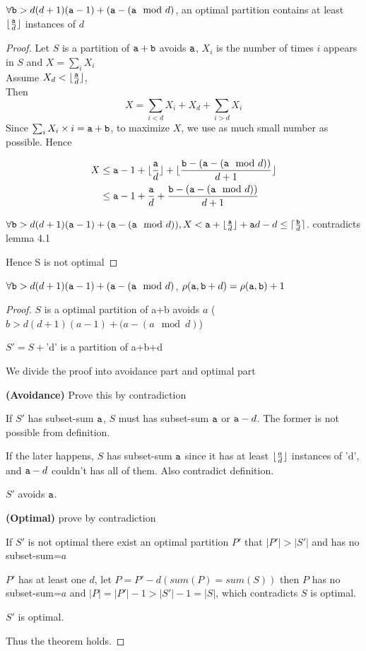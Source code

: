 \begin{theorem} 
$\forall \mathtt{b}>d(d+1)(\mathtt{a}-1)  + (\mathtt{a} - (\mathtt{a}\mod d)$, an optimal partition contains at least $\lfloor{\frac{\mathtt{a}}{d}}\rfloor$ instances of $d$
\end{theorem}

\begin{proof} 
    Let $S$ is a partition of $\mathtt{a}+\mathtt{b}$ avoids $\mathtt{a}$,   $X_i$ is the number of times $i$ appears in $S$  and  $X = \sum_i{X_i}$  \\  

    Assume $X_d<\lfloor{\frac{\mathtt{a}}{d}} \rfloor $, \\

    Then 
    \[
    X=\sum_{i<d}{X_i}+X_d+\sum_{i>d}{X_i}
    \]
    Since $\sum_i{X_i\times i}=\mathtt{a}+\mathtt{b}$, to maximize $X$, we use as much small number as possible. Hence

    \begin{align*}
    X&\leq \mathtt{a}-1+ \lfloor\frac{\mathtt{a}}{d}\rfloor   +\lfloor{\frac{\mathtt{b}-(\mathtt{a}- (\mathtt{a}\mod d))}{d+1}}\rfloor\\
     &\leq \mathtt{a}-1+ \frac{\mathtt{a}}{d}   +{\frac{\mathtt{b}-(\mathtt{a} - (\mathtt{a}\mod d))}{d+1}}
    \end{align*}
    
    $\forall \mathtt{b}>d(d+1)(\mathtt{a}-1) + (\mathtt{a} - (\mathtt{a}\mod d)), \\
    X<\mathtt{a}+\lfloor\frac{\mathtt{a}}{d}\rfloor + \mathtt{a} d -d \leq \lceil\frac{\mathtt{b}}{d}\rceil$.    contradicts lemma 4.1

    Hence  S is not optimal
\end{proof}

\begin{theorem}
	$\forall \mathtt{b}>d(d+1)(\mathtt{a}-1)  + (\mathtt{a} - (\mathtt{a}\mod d)$, $\rho(\mathtt{a},\mathtt{b}+d)=\rho(\mathtt{a},\mathtt{b})+1$
\end{theorem}

\begin{proof}
    $S$ is a optimal partition of a+b avoids $a$ ($b>d(d+1)(a-1)  + (a - (a\mod d)$)
    
    $S'=S+$'d' is a partition of a+b+d 

    We divide the proof into avoidance part and optimal part

    {\bf(Avoidance)}
    Prove this by contradiction

    If $S'$ has subset-sum $\mathtt{a}$, $S$ must has subset-sum $\mathtt{a}$ or $\mathtt{a}-d$. The former is not possible from definition. 

    If the later happens, $S$ has subset-sum $\mathtt{a}$ since it has at least $\lfloor{\frac{a}{d}}\rfloor$ instances of 'd', and $\mathtt{a}-d$ couldn't has all of them.
    Also contradict definition.

    $S'$ avoids $\mathtt{a}$.

    {\bf(Optimal)}
        prove by contradiction

        If $S'$ is not optimal there exist an optimal partition $P'$ that $|P'|>|S'|$ and has no subset-sum=$a$

        $P'$ has at least one $d$, let $P=P'-d(sum(P)=sum(S))$ then $P$ has no subset-sum=$a$ and $|P|=|P'|-1>|S'|-1=|S|$, which contradicts $S$ is optimal.

        $S'$ is optimal.

    Thus the theorem holds.
\end{proof}

